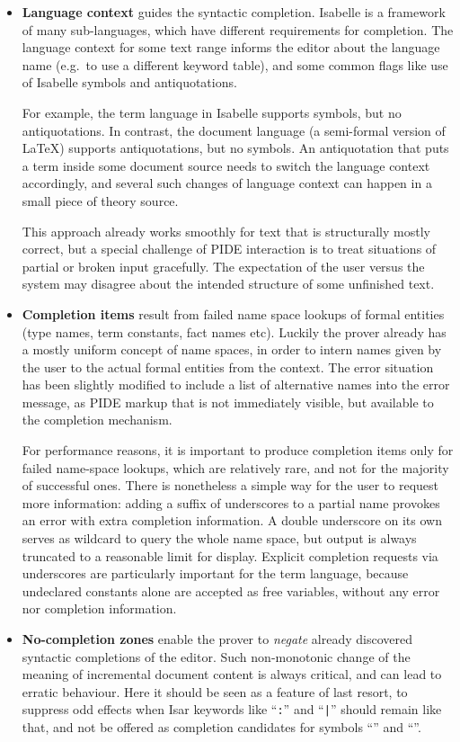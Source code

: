 \begin{isabellebody}
\begin{isamarkuptext}
\begin{itemize}
\begin{itemize}
\item \textbf{Language context} guides the syntactic completion. Isabelle is
a framework of many sub-languages, which have different requirements for
completion. The language context for some text range informs the editor
about the language name (e.g.\ to use a different keyword table), and some
common flags like use of Isabelle symbols and antiquotations.

For example, the term language in Isabelle supports symbols, but no
antiquotations. In contrast, the document language (a semi-formal version of
{\LaTeX}) supports antiquotations, but no symbols. An antiquotation that
puts a term inside some document source needs to switch the language context
accordingly, and several such changes of language context can happen in a
small piece of theory source.

This approach already works smoothly for text that is structurally mostly
correct, but a special challenge of PIDE interaction is to treat situations
of partial or broken input gracefully. The expectation of the user versus
the system may disagree about the intended structure of some unfinished
text.

\item \textbf{Completion items} result from failed name space lookups of
formal entities (type names, term constants, fact names etc). Luckily the
prover already has a mostly uniform concept of name spaces, in order to
intern names given by the user to the actual formal entities from the
context. The error situation has been slightly modified to include a list of
alternative names into the error message, as PIDE markup that is not
immediately visible, but available to the completion mechanism.

For performance reasons, it is important to produce completion items only
for failed name-space lookups, which are relatively rare, and not for the
majority of successful ones. There is nonetheless a simple way for the user
to request more information: adding a suffix of underscores to a partial
name provokes an error with extra completion information. A double
underscore on its own serves as wildcard to query the whole name space, but
output is always truncated to a reasonable limit for display. Explicit
completion requests via underscores are particularly important for the term
language, because undeclared constants alone are accepted as free variables,
without any error nor completion information.

\item \textbf{No-completion zones} enable the prover to \emph{negate}
already discovered syntactic completions of the editor. Such non-monotonic
change of the meaning of incremental document content is always critical,
and can lead to erratic behaviour. Here it should be seen as a feature of
last resort, to suppress odd effects when Isar keywords like ``\verb|:|'' and ``\verb||\verb,|,\verb||'' should remain like that, and not be offered
as completion candidates for symbols ``\isa{{\isasymin}}'' and ``\isa{{\isasymor}}''.


\end{itemize}
\end{itemize}
\end{isamarkuptext}
\end{isabellebody}

